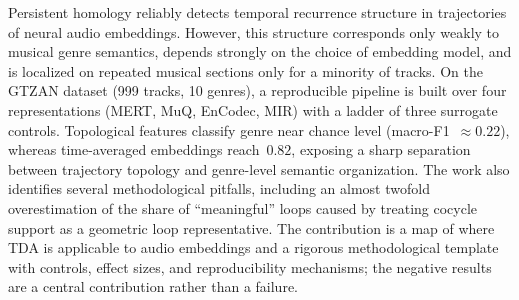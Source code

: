 Persistent homology reliably detects temporal recurrence structure in trajectories of neural audio embeddings. However, this structure corresponds only weakly to musical genre semantics, depends strongly on the choice of embedding model, and is localized on repeated musical sections only for a minority of tracks. On the GTZAN dataset (999 tracks, 10 genres), a reproducible pipeline is built over four representations (MERT, MuQ, EnCodec, MIR) with a ladder of three surrogate controls. Topological features classify genre near chance level (macro-F1~$\approx 0.22$), whereas time-averaged embeddings reach~$0.82$, exposing a sharp separation between trajectory topology and genre-level semantic organization. The work also identifies several methodological pitfalls, including an almost twofold overestimation of the share of ``meaningful'' loops caused by treating cocycle support as a geometric loop representative. The contribution is a map of where TDA is applicable to audio embeddings and a rigorous methodological template with controls, effect sizes, and reproducibility mechanisms; the negative results are a central contribution rather than a failure.
